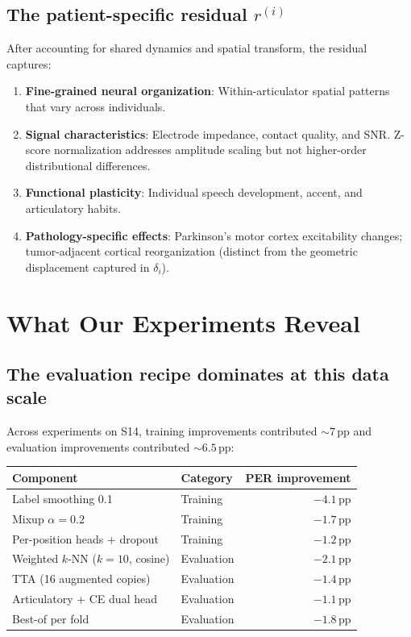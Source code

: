 \documentclass[11pt,letterpaper]{article}
\newcommand{\pp}{\,\text{pp}}
\begin{document}
\subsection{The patient-specific residual $r^{(i)}$}

After accounting for shared dynamics and spatial transform, the residual captures:
\begin{enumerate}[leftmargin=2em]
\item \textbf{Fine-grained neural organization}: Within-articulator spatial patterns that vary across individuals.
\item \textbf{Signal characteristics}: Electrode impedance, contact quality, and SNR. Z-score normalization addresses amplitude scaling but not higher-order distributional differences.
\item \textbf{Functional plasticity}: Individual speech development, accent, and articulatory habits.
\item \textbf{Pathology-specific effects}: Parkinson's motor cortex excitability changes; tumor-adjacent cortical reorganization (distinct from the geometric displacement captured in $\delta_i$).
\end{enumerate}


\section{What Our Experiments Reveal}

\subsection{The evaluation recipe dominates at this data scale}

Across experiments on S14, training improvements contributed ${\sim}7\pp$ and evaluation improvements contributed ${\sim}6.5\pp$:

\begin{table}[h]
\centering\small
\begin{tabular}{@{}llr@{}}
\toprule
\textbf{Component} & \textbf{Category} & \textbf{PER improvement} \\
\midrule
Label smoothing 0.1 & Training & $-4.1\pp$ \\
Mixup $\alpha{=}0.2$ & Training & $-1.7\pp$ \\
Per-position heads + dropout & Training & $-1.2\pp$ \\
\midrule
Weighted $k$-NN ($k{=}10$, cosine) & Evaluation & $-2.1\pp$ \\
TTA (16 augmented copies) & Evaluation & $-1.4\pp$ \\
Articulatory + CE dual head & Evaluation & $-1.1\pp$ \\
Best-of per fold & Evaluation & $-1.8\pp$ \\
\bottomrule
\end{tabular}
\end{table}
\end{document}
